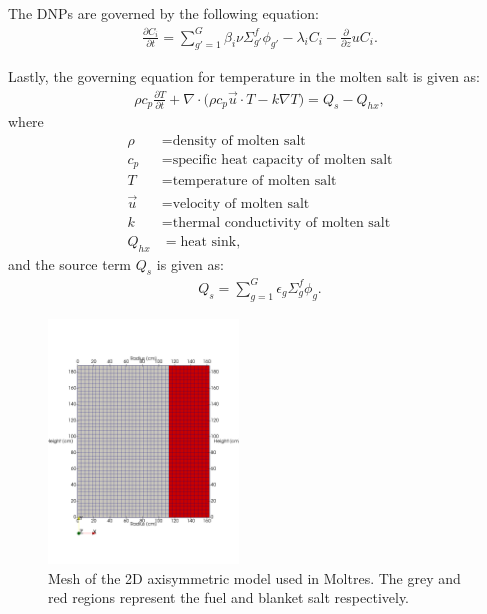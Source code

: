 \documentclass{anstrans}
\begin{document}
	The \glspl{DNP} are governed by the following equation:
%
\begin{align}
	\frac{\partial C_i}{\partial t} = \sum^G_{g'=1} \beta_i \nu \Sigma^f_{g'}
	\phi_{g'} - \lambda_i C_i - \frac{\partial}{\partial z} u C_i. \label{eq2}
\end{align}

	Lastly, the governing equation for temperature in the molten salt is given
	as:
%
\begin{align}
	\rho c_{p} \frac{\partial T}{\partial t} + \nabla \cdot \big( \rho
	c_{p} \overrightarrow{u} \cdot T - k \nabla T \big) = Q_s - Q_{hx},
	\label{eq3}
\end{align}
%
	where
{\small
\begin{align*}
	\rho &= \text{density of molten salt} \\
	c_{p} &= \text{specific heat capacity of molten salt} \\
	T &= \text{temperature of molten salt} \\
	\overrightarrow{u} &= \text{velocity of molten salt} \\
	k &= \text{thermal conductivity of molten salt} \\
	Q_{hx} &= \text{heat sink},
\end{align*}
}
	and the source term $Q_s$ is given as:
%
\begin{align}
Q_s = \sum^G_{g=1} \epsilon_g \Sigma_g^f \phi_g. \label{eq4}
\end{align}
%
\begin{figure}[h] 
	\centering
	\includegraphics[width=0.45\textwidth]{./figures/mesh}
	\captionsetup{justification=centering}
	\caption{Mesh of the 2D axisymmetric model used in Moltres.
	The grey and red regions represent the fuel and blanket salt respectively.}
	\label{fig:mesh}
\end{figure} 
\end{document}
